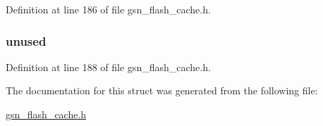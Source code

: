 Definition at line 186 of file gsn\_\-flash\_\-cache.h.

\hypertarget{a00076_a2c3ace150ddcb10d297a6d30b67d6330}{
\subsubsection[{unused}]{ {\bf unused}}}
\label{a00076_a2c3ace150ddcb10d297a6d30b67d6330}


Definition at line 188 of file gsn\_\-flash\_\-cache.h.



The documentation for this struct was generated from the following file:\begin{DoxyCompactItemize}
\item 
\hyperlink{a00500}{gsn\_\-flash\_\-cache.h}\end{DoxyCompactItemize}
